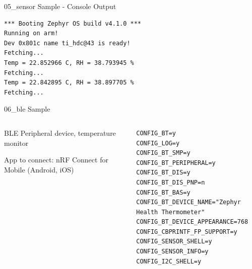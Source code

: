 \documentclass[10pt, aspectratio=169]{beamer}
\begin{document}
\begin{frame}[fragile]{05\_sensor Sample - Console Output}
  \begin{listing}[H]
    \begin{verbatim}
*** Booting Zephyr OS build v4.1.0 ***
Running on arm!
Dev 0x801c name ti_hdc@43 is ready!
Fetching...
Temp = 22.852966 C, RH = 38.793945 %
Fetching...
Temp = 22.842895 C, RH = 38.897705 %
Fetching...
    \end{verbatim}
  \end{listing}
\end{frame}
\begin{frame}[fragile]{06\_ble Sample}
  \begin{columns}
    \begin{column}{0.6\textwidth}
      \begin{description}
     \item
	\item [Description] BLE Peripheral device, temperature monitor \footnotemark
	\item [Sample] App to connect: nRF Connect for Mobile (Android, iOS)
      \end{description}
    \end{column}
    \begin{column}{0.4\textwidth}
        {\fontsize{6}{6}\selectfont
  \begin{listing}[H]
    \begin{verbatim}
CONFIG_BT=y
CONFIG_LOG=y
CONFIG_BT_SMP=y
CONFIG_BT_PERIPHERAL=y
CONFIG_BT_DIS=y
CONFIG_BT_DIS_PNP=n
CONFIG_BT_BAS=y
CONFIG_BT_DEVICE_NAME="Zephyr Health Thermometer"
CONFIG_BT_DEVICE_APPEARANCE=768
CONFIG_CBPRINTF_FP_SUPPORT=y
CONFIG_SENSOR_SHELL=y
CONFIG_SENSOR_INFO=y
CONFIG_I2C_SHELL=y
    \end{verbatim}
    \caption{\scriptsize{Excerpt from samples/06\_ble/prj.conf}}
  \end{listing}
        }
    \end{column}
  \end{columns}
\end{frame}
\end{document}
